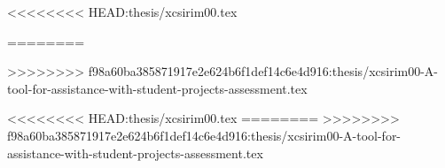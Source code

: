 \documentclass[english,odsaz]{fitthesis} %
\begin{document}
  \ifODSAZ
    \setlength{\parskip}{0.5\bigskipamount}
  \else
    \setlength{\parskip}{0pt}
  \fi
  
  \iftwoside
    \cleardoublepage
  \fi
  
  \ifenglish
<<<<<<<< HEAD:thesis/xcsirim00.tex
    
  \else
    
========
    
  \else
    
>>>>>>>> f98a60ba385871917e2e624b6f1def14c6e4d916:thesis/xcsirim00-A-tool-for-assistance-with-student-projects-assessment.tex
  \fi
  
<<<<<<<< HEAD:thesis/xcsirim00.tex
========
>>>>>>>> f98a60ba385871917e2e624b6f1def14c6e4d916:thesis/xcsirim00-A-tool-for-assistance-with-student-projects-assessment.tex
  
\end{document}
